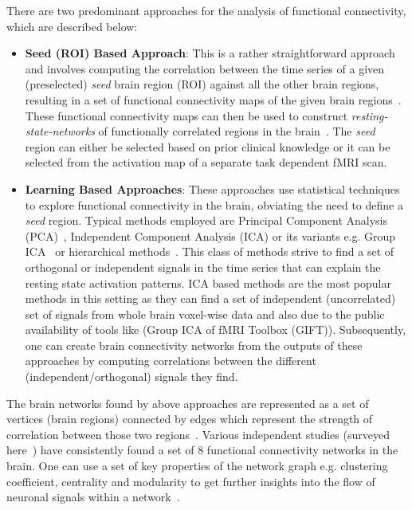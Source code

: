 \documentclass{article}
\begin{document}
There are two predominant approaches for the analysis of functional connectivity, which are described below:
\begin{itemize}
\item {\bf Seed (ROI) Based Approach}:  This is a rather straightforward approach and involves computing the correlation between the time series of a given (preselected) {\it seed} brain region (ROI) against all the other brain regions, resulting in a set of functional connectivity maps of the given brain regions~\citep{biswal1997simultaneous,cordes2000mapping}. These functional connectivity maps can then be used to construct {\it resting-state-networks} of functionally correlated regions in the brain~\citep{damoiseaux2006consistent,fox2005human,beckmann2005investigations}. The {\it seed} region can either be selected based on prior clinical knowledge or it can be selected from the activation map of a separate task dependent fMRI scan.
\item {\bf Learning Based Approaches}: These approaches use statistical techniques to explore functional connectivity in the brain, obviating the need to define a {\it seed} region. Typical methods employed are Principal Component Analysis (PCA)~\citep{friston1998disconnection}, Independent Component Analysis (ICA) or its variants e.g. Group ICA~\citep{beckmann2005investigations,calhoun2001method,petrella2011default} or hierarchical methods~\citep{cordes2002hierarchical,salvador2005neurophysiological}. This class of methods strive to find a set of orthogonal or independent signals in the time series that can explain the resting state activation patterns. ICA based methods are the most popular methods in this setting as they can find a set of independent (uncorrelated) set of signals from whole brain voxel-wise data and also due to the public availability of  tools like (Group ICA of fMRI Toolbox (GIFT)). Subsequently, one can create brain connectivity networks from the outputs of these approaches by computing correlations between the different (independent/orthogonal) signals they find.
 \end{itemize} 


The brain networks found by above approaches are represented as a set of vertices (brain regions) connected by edges which represent the strength of correlation between those two regions~\citep{he2010graph,stam2007graph}. Various independent studies (surveyed here~\citep{van2010exploring}) have consistently found a set of 8 functional connectivity networks in the brain. One can use a set of key properties of the network graph e.g. clustering coefficient, centrality and modularity to get further insights into the flow of neuronal signals within a network~\citep{he2010graph,stam2007graph}.
\end{document}
